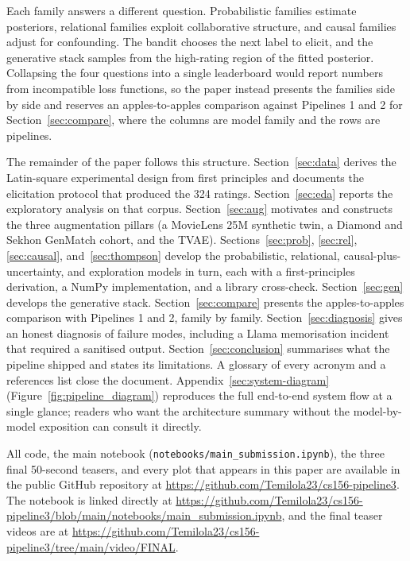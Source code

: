 \documentclass{article}
\begin{document}
Each family answers a different question. Probabilistic families estimate posteriors, relational families exploit collaborative structure, and causal families adjust for confounding. The bandit chooses the next label to elicit, and the generative stack samples from the high-rating region of the fitted posterior. Collapsing the four questions into a single leaderboard would report numbers from incompatible loss functions, so the paper instead presents the families side by side and reserves an apples-to-apples comparison against Pipelines 1 and 2 for Section~\ref{sec:compare}, where the columns are model family and the rows are pipelines.

The remainder of the paper follows this structure. Section~\ref{sec:data} derives the Latin-square experimental design from first principles and documents the elicitation protocol that produced the 324 ratings. Section~\ref{sec:eda} reports the exploratory analysis on that corpus. Section~\ref{sec:aug} motivates and constructs the three augmentation pillars (a MovieLens 25M synthetic twin, a Diamond and Sekhon GenMatch cohort, and the TVAE). Sections~\ref{sec:prob}, \ref{sec:rel}, \ref{sec:causal}, and~\ref{sec:thompson} develop the probabilistic, relational, causal-plus-uncertainty, and exploration models in turn, each with a first-principles derivation, a NumPy implementation, and a library cross-check. Section~\ref{sec:gen} develops the generative stack. Section~\ref{sec:compare} presents the apples-to-apples comparison with Pipelines 1 and 2, family by family. Section~\ref{sec:diagnosis} gives an honest diagnosis of failure modes, including a Llama memorisation incident that required a sanitised output. Section~\ref{sec:conclusion} summarises what the pipeline shipped and states its limitations. A glossary of every acronym and a references list close the document.
Appendix~\ref{sec:system-diagram} (Figure~\ref{fig:pipeline_diagram}) reproduces the full end-to-end system flow at a single glance; readers who want the architecture summary without the model-by-model exposition can consult it directly.

All code, the main notebook (\texttt{notebooks/main\_submission.ipynb}), the three final 50-second teasers, and every plot that appears in this paper are available in the public GitHub repository at \url{https://github.com/Temilola23/cs156-pipeline3}. The notebook is linked directly at \url{https://github.com/Temilola23/cs156-pipeline3/blob/main/notebooks/main_submission.ipynb}, and the final teaser videos are at \url{https://github.com/Temilola23/cs156-pipeline3/tree/main/video/FINAL}.
\end{document}
